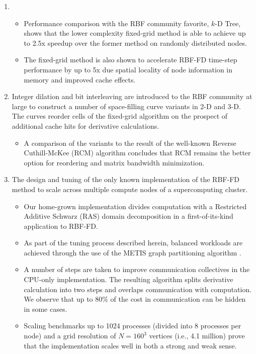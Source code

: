 \begin{enumerate} 
\item 
\begin{itemize} 
\item Performance comparison with the RBF community favorite, $k$-D Tree, shows that the lower complexity fixed-grid method is able to achieve up to 2.5x speedup over the former method on randomly distributed nodes. 
\item The fixed-grid method is also shown to accelerate RBF-FD time-step performance by up to 5x due spatial locality of node information in memory and improved cache effects.
\end{itemize} 
\item Integer dilation and bit interleaving are introduced to the RBF community at large to construct a number of space-filling curve variants in 2-D and 3-D. The curves reorder cells of the fixed-grid algorithm on the prospect of additional cache hits for derivative calculations. 
\begin{itemize} 
\item A comparison of the variants to the result of the well-known Reverse Cuthill-McKee (RCM) algorithm concludes that RCM remains the better option for reordering and matrix bandwidth minimization.
\end{itemize} 
\item The design and tuning of the only known implementation of the RBF-FD method to scale across multiple compute nodes of a supercomputing cluster.
\begin{itemize} 
\item Our home-grown implementation divides computation with a Restricted Additive Schwarz (RAS) domain decomposition in a first-of-its-kind application to RBF-FD. %
\item As part of the tuning process described herein, balanced workloads are achieved through the use of the METIS graph partitioning algorithm \cite{Karypis1999}.  
\item A number of steps are taken to improve communication collectives in the CPU-only implementation. The resulting algorithm splits derivative calculation into two steps and overlaps communication with computation. We observe that up to 80\% of the cost in communication can be hidden in some cases. 
\item Scaling benchmarks up to 1024 processes (divided into 8 processes per node) and a grid resolution of $N=160^3$ vertices (i.e., 4.1 million) prove that the implementation scales well in both a strong and weak sense. 

\end{itemize}
\end{enumerate}
